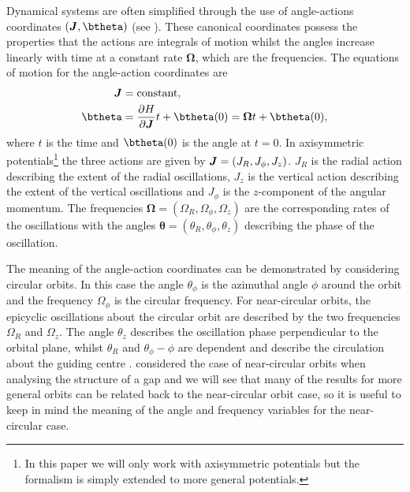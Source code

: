 \documentclass[useAMS,usenatbib,fleqn,a4paper]{mn2e}
\newcommand{\bs}[1]{\bmath{#1}}
\begin{document}
Dynamical systems are often simplified through the use of angle-actions coordinates $(\bs{J},\btheta)$ (see \citealt{BinneyTremaine}). These canonical coordinates possess the properties that the actions are integrals of motion whilst the angles increase linearly with time at a constant rate $\boldsymbol{\Omega}$, which are the frequencies. The equations of motion for the angle-action coordinates are
\begin{equation}
\begin{split}
\bs{J}&=\mathrm{constant},\\
\btheta&=\frac{\partial H}{\partial\boldsymbol{J}}t+\btheta(0)=\boldsymbol{\Omega}t+\btheta(0),
\end{split}
\label{angleactdef}
\end{equation}
where $t$ is the time and $\btheta(0)$ is the angle at $t=0$. In axisymmetric potentials\footnote{In this paper we will only work with axisymmetric potentials but the formalism is simply extended to more general potentials.} the three actions are given by $\bs{J}=(J_R,J_\phi,J_z)$. $J_R$ is the radial action describing the extent of the radial oscillations, $J_z$ is the vertical action describing the extent of the vertical oscillations and $J_\phi$ is the $z$-component of the angular momentum. The frequencies $\boldsymbol{\Omega}=(\Omega_R,\Omega_\phi,\Omega_z)$  are the corresponding rates of the oscillations with the angles $\boldsymbol{\theta}=(\theta_R,\theta_\phi,\theta_z)$ describing the phase of the oscillation.

The meaning of the angle-action coordinates can be demonstrated by considering circular orbits. In this case the angle $\theta_\phi$ is the azimuthal angle $\phi$ around the orbit and the frequency $\Omega_\phi$ is the circular frequency. For near-circular orbits, the epicyclic oscillations about the circular orbit are described by the two frequencies $\Omega_R$ and $\Omega_z$. The angle $\theta_z$ describes the oscillation phase perpendicular to the orbital plane, whilst $\theta_R$ and $\theta_\phi-\phi$ are dependent and describe the circulation about the guiding centre \citep[][equation 3.265]{BinneyTremaine}
. \cite{ErkalBelokurov2015} considered the case of near-circular orbits when analysing the structure of a gap and we will see that many of the results for more general orbits can be related back to the near-circular orbit case, so it is useful to keep in mind the meaning of the angle and frequency variables for the near-circular case.
\end{document}
